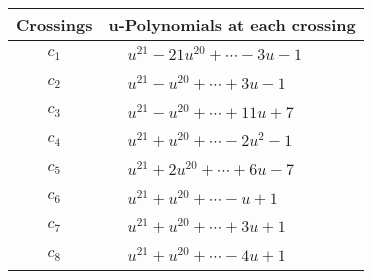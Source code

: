 \documentclass[1p]{elsarticle_modified}
\theoremstyle{definition}
\begin{document}
\begin{tabular}{m{50pt}|m{274pt}}
Crossings & \hspace{64pt}u-Polynomials at each crossing \\
\hline $$\begin{aligned}c_{1}\end{aligned}$$&$\begin{aligned}
&u^{21}-21 u^{20}+\cdots-3 u-1
\end{aligned}$\\
\hline $$\begin{aligned}c_{2}\end{aligned}$$&$\begin{aligned}
&u^{21}- u^{20}+\cdots+3 u-1
\end{aligned}$\\
\hline $$\begin{aligned}c_{3}\end{aligned}$$&$\begin{aligned}
&u^{21}- u^{20}+\cdots+11 u+7
\end{aligned}$\\
\hline $$\begin{aligned}c_{4}\end{aligned}$$&$\begin{aligned}
&u^{21}+u^{20}+\cdots-2 u^2-1
\end{aligned}$\\
\hline $$\begin{aligned}c_{5}\end{aligned}$$&$\begin{aligned}
&u^{21}+2 u^{20}+\cdots+6 u-7
\end{aligned}$\\
\hline $$\begin{aligned}c_{6}\end{aligned}$$&$\begin{aligned}
&u^{21}+u^{20}+\cdots- u+1
\end{aligned}$\\
\hline $$\begin{aligned}c_{7}\end{aligned}$$&$\begin{aligned}
&u^{21}+u^{20}+\cdots+3 u+1
\end{aligned}$\\
\hline $$\begin{aligned}c_{8}\end{aligned}$$&$\begin{aligned}
&u^{21}+u^{20}+\cdots-4 u+1
\end{aligned}$\\

\end{tabular}
\end{document}
